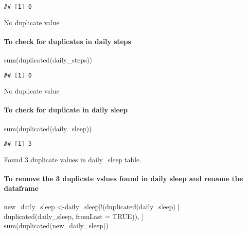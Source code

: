 \documentclass[
]{article}
\newenvironment{Shaded}{\begin{snugshade}}{\end{snugshade}}
\newcommand{\AttributeTok}[1]{\textcolor[rgb]{0.77,0.63,0.00}{#1}}
\newcommand{\ConstantTok}[1]{\textcolor[rgb]{0.00,0.00,0.00}{#1}}
\newcommand{\FunctionTok}[1]{\textcolor[rgb]{0.00,0.00,0.00}{#1}}
\newcommand{\NormalTok}[1]{#1}
\newcommand{\OtherTok}[1]{\textcolor[rgb]{0.56,0.35,0.01}{#1}}
\newcommand{\SpecialCharTok}[1]{\textcolor[rgb]{0.00,0.00,0.00}{#1}}
\begin{document}
\begin{verbatim}
## [1] 0
\end{verbatim}

No duplicate value

\hypertarget{to-check-for-duplicates-in-daily-steps}{%
\paragraph{To check for duplicates in daily
steps}\label{to-check-for-duplicates-in-daily-steps}}

\begin{Shaded}
\begin{Highlighting}[]
\FunctionTok{sum}\NormalTok{(}\FunctionTok{duplicated}\NormalTok{(daily\_steps))}
\end{Highlighting}
\end{Shaded}

\begin{verbatim}
## [1] 0
\end{verbatim}

No duplicate value

\hypertarget{to-check-for-duplicate-in-daily-sleep}{%
\paragraph{To check for duplicate in daily
sleep}\label{to-check-for-duplicate-in-daily-sleep}}

\begin{Shaded}
\begin{Highlighting}[]
\FunctionTok{sum}\NormalTok{(}\FunctionTok{duplicated}\NormalTok{(daily\_sleep))}
\end{Highlighting}
\end{Shaded}

\begin{verbatim}
## [1] 3
\end{verbatim}

Found 3 duplicate values in daily\_sleep table.

\hypertarget{to-remove-the-3-duplicate-vslues-found-in-daily-sleep-and-rename-the-dataframe}{%
\paragraph{To remove the 3 duplicate vslues found in daily sleep and
rename the
dataframe}\label{to-remove-the-3-duplicate-vslues-found-in-daily-sleep-and-rename-the-dataframe}}

\begin{Shaded}
\begin{Highlighting}[]
\NormalTok{new\_daily\_sleep }\OtherTok{\textless{}{-}}\NormalTok{daily\_sleep[}\SpecialCharTok{!}\NormalTok{(}\FunctionTok{duplicated}\NormalTok{(daily\_sleep) }\SpecialCharTok{|} \FunctionTok{duplicated}\NormalTok{(daily\_sleep, }\AttributeTok{fromLast =} \ConstantTok{TRUE}\NormalTok{)), ]}
\FunctionTok{sum}\NormalTok{(}\FunctionTok{duplicated}\NormalTok{(new\_daily\_sleep))}
\end{Highlighting}
\end{Shaded}
\end{document}
